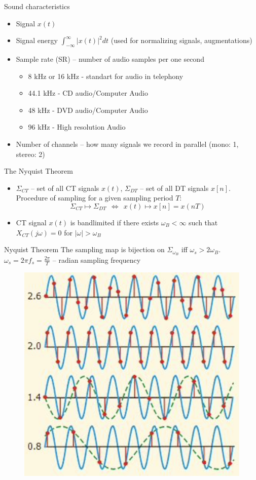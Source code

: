 \begin{frame}{Sound characteristics}
	\begin{itemize}
		\item Signal $x(t)$
		\item Signal energy $\int_{-\infty}^{\infty}|x(t)|^2 d t$ (used for normalizing signals, augmentations)
		\item Sample rate (SR) -- number of audio samples per one second
			\begin{itemize}
				\item 8 kHz or 16 kHz - standart for audio in telephony
				\item 44.1 kHz - CD audio/Computer Audio
				\item 48 kHz - DVD audio/Computer Audio
				\item 96 kHz - High resolution Audio
			\end{itemize}
		\item Number of channels -- how many signals we record in parallel (mono: 1, stereo: 2)
	\end{itemize}
\end{frame}
\begin{frame}{The Nyquist Theorem}
	\begin{itemize}
		\item $\Sigma_{C T}$ -- set of all CT signals $x(t)$, $\Sigma_{D T}$ -- set of all DT signals $x[n]$. Procedure of sampling for a given sampling period $T$:
		$$
		\Sigma_{C T} \longmapsto \Sigma_{D T} ~~\Leftrightarrow ~~x(t) \longmapsto x[n]=x(n T)
		$$
		\item CT signal $x(t)$ is bandlimited if there exists $\omega_B<\infty$ such that $X_{C T}(j \omega)=0$ for $|\omega|>\omega_B$
	\end{itemize}
	
	\begin{block}{Nyquist Theorem}
		The sampling map is bijection on $\Sigma_{\omega_B}$ iff $\omega_s>2 \omega_B$. $\omega_s=2 \pi f_s=\frac{2 \pi}{T}$ -- radian sampling frequency
	\end{block}
\begin{figure}
	\centering
	\includegraphics[width=0.38\linewidth]{figs/nyquist.png}
\end{figure}
\end{frame}

